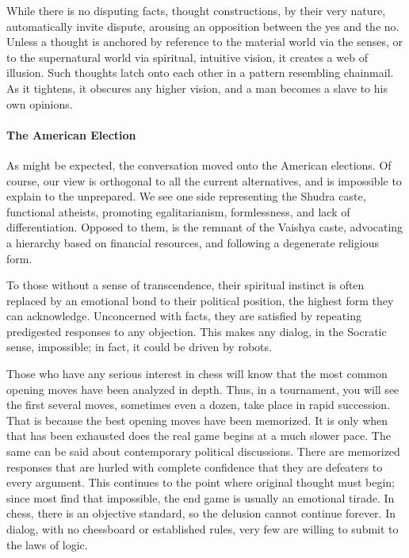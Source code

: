 While there is no disputing facts, thought constructions, by their very nature, automatically invite dispute, arousing an opposition between the yes and the no. Unless a thought is anchored by reference to the material world via the senses, or to the supernatural world via spiritual, intuitive vision, it creates a web of illusion. Such thoughts latch onto each other in a pattern resembling chainmail. As it tightens, it obscures any higher vision, and a man becomes a slave to his own opinions.

\paragraph{The American Election}


As might be expected, the conversation moved onto the American elections. Of course, our view is orthogonal to all the current alternatives, and is impossible to explain to the unprepared. We see one side representing the Shudra caste, functional atheists, promoting egalitarianism, formlessness, and lack of differentiation. Opposed to them, is the remnant of the Vaishya caste, advocating a hierarchy based on financial resources, and following a degenerate religious form.

To those without a sense of transcendence, their spiritual instinct is often replaced by an emotional bond to their political position, the highest form they can acknowledge. Unconcerned with facts, they are satisfied by repeating predigested responses to any objection. This makes any dialog, in the Socratic sense, impossible; in fact, it could be driven by robots.

Those who have any serious interest in chess will know that the most common opening moves have been analyzed in depth. Thus, in a tournament, you will see the first several moves, sometimes even a dozen, take place in rapid succession. That is because the best opening moves have been memorized. It is only when that has been exhausted does the real game begins at a much slower pace. The same can be said about contemporary political discussions. There are memorized responses that are hurled with complete confidence that they are defeaters to every argument. This continues to the point where original thought must begin; since most find that impossible, the end game is usually an emotional tirade. In chess, there is an objective standard, so the delusion cannot continue forever. In dialog, with no chessboard or established rules, very few are willing to submit to the laws of logic.

